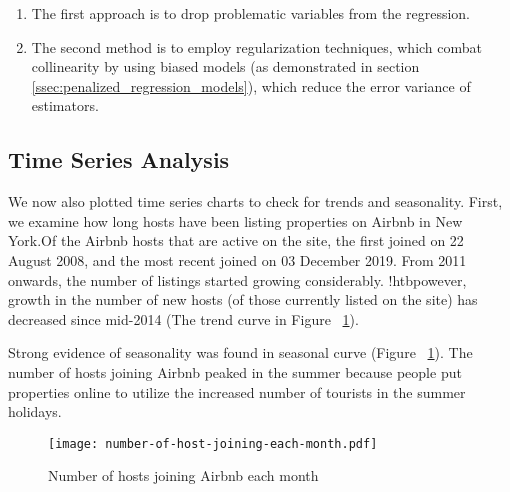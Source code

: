 \begin{enumerate}
    \item The first approach is to drop problematic variables from the regression.
    \item The second method is to employ regularization techniques, which combat
        collinearity by using biased models (as demonstrated in section \ref{ssec:penalized_regression_models}),
        which reduce the error variance of estimators.
\end{enumerate}

\subsection{Time Series Analysis}
\label{sec:time_series}

We now also plotted time series charts to check for trends and seasonality.
First, we examine how long hosts have been listing properties on Airbnb in New
York.Of the Airbnb hosts that are active on the site, the first joined on 22
August 2008, and the most recent joined on 03 December 2019.
From 2011 onwards, the number of listings started growing considerably. !htbpowever,
growth in the number of new hosts (of those currently listed on the site) has
decreased since mid-2014 (The trend curve in Figure
~\ref{fig:number_of_hosts_joining}).

Strong evidence of seasonality was found in  seasonal curve (Figure
~\ref{fig:number_of_hosts_joining}). The number of hosts joining Airbnb peaked in
the summer because people put properties online to utilize the increased number
of tourists in the summer holidays.






\begin{figure}[!htbp] \centering
    \texttt{[image: number-of-host-joining-each-month.pdf]}
    \caption{Number of hosts joining Airbnb each month}
    \label{fig:number_of_hosts_joining}
\end{figure}

